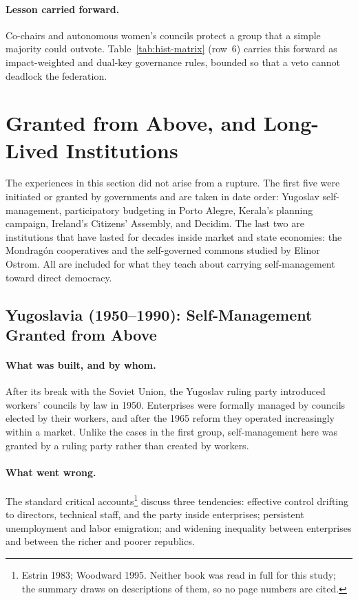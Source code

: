 \documentclass[10pt,twoside,openany]{book}
\theoremstyle{dpepstyle}
\begin{document}
\paragraph{Lesson carried forward.} Co-chairs and autonomous women's councils protect a group that a simple majority could outvote. Table~\ref{tab:hist-matrix} (row~6) carries this forward as impact-weighted and dual-key governance rules, bounded so that a veto cannot deadlock the federation.

\section{Granted from Above, and Long-Lived Institutions}
\label{sec:hist-further}

The experiences in this section did not arise from a rupture. The first five were initiated or granted by governments and are taken in date order: Yugoslav self-management, participatory budgeting in Porto Alegre, Kerala's planning campaign, Ireland's Citizens' Assembly, and Decidim. The last two are institutions that have lasted for decades inside market and state economies: the Mondrag\'on cooperatives and the self-governed commons studied by Elinor Ostrom. All are included for what they teach about carrying self-management toward direct democracy.

\subsection{Yugoslavia (1950--1990): Self-Management Granted from Above}
\label{sec:hist-yugoslavia}

\paragraph{What was built, and by whom.} After its break with the Soviet Union, the Yugoslav ruling party introduced workers' councils by law in 1950. Enterprises were formally managed by councils elected by their workers, and after the 1965 reform they operated increasingly within a market. Unlike the cases in the first group, self-management here was granted by a ruling party rather than created by workers.

\paragraph{What went wrong.} The standard critical accounts\footnote{Estrin 1983; Woodward 1995. Neither book was read in full for this study; the summary draws on descriptions of them, so no page numbers are cited.} discuss three tendencies: effective control drifting to directors, technical staff, and the party inside enterprises; persistent unemployment and labor emigration; and widening inequality between enterprises and between the richer and poorer republics.
\end{document}
